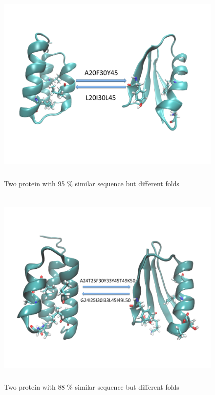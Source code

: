 \documentclass[12pt]{article}
\begin{document}
\begin{figure}
\begin{center}
\includegraphics[width=12cm,height=10cm]{G95.pdf}
\end{center}
\caption{Two protein with 95 \% similar sequence but different folds}
\label{fig:G95}
\end{figure}

\begin{figure}
\begin{center}
\includegraphics[width=12cm,height=10cm]{G88.pdf}
\end{center}
\caption{Two protein with 88 \% similar sequence but different folds}
\label{fig:G88}
\end{figure}
\end{document}
